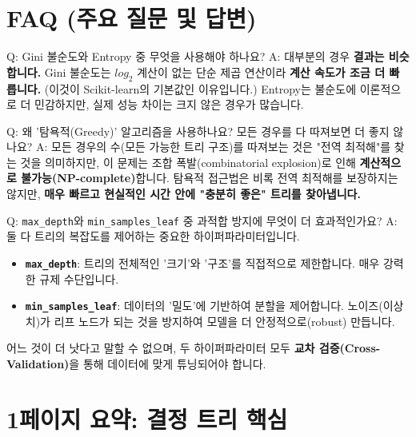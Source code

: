 \documentclass[11pt,a4paper]{book}
\theoremstyle{definition}
\begin{document}
\section{FAQ (주요 질문 및 답변)}

\begin{tcolorbox}{Q: Gini 불순도와 Entropy 중 무엇을 사용해야 하나요?}
    A: 대부분의 경우 \textbf{결과는 비슷합니다.}
    Gini 불순도는 $log_2$ 계산이 없는 단순 제곱 연산이라 \textbf{계산 속도가 조금 더 빠릅니다.} (이것이 Scikit-learn의 기본값인 이유입니다.)
    Entropy는 불순도에 이론적으로 더 민감하지만, 실제 성능 차이는 크지 않은 경우가 많습니다.
\end{tcolorbox}

\begin{tcolorbox}{Q: 왜 '탐욕적(Greedy)' 알고리즘을 사용하나요? 모든 경우를 다 따져보면 더 좋지 않나요?}
    A: 모든 경우의 수(모든 가능한 트리 구조)를 따져보는 것은 "전역 최적해"를 찾는 것을 의미하지만, 이 문제는 조합 폭발(combinatorial explosion)로 인해 \textbf{계산적으로 불가능(NP-complete)}합니다.
    탐욕적 접근법은 비록 전역 최적해를 보장하지는 않지만, \textbf{매우 빠르고 현실적인 시간 안에 "충분히 좋은" 트리를 찾아냅니다.}
\end{tcolorbox}

\begin{tcolorbox}{Q: \texttt{max\_depth}와 \texttt{min\_samples\_leaf} 중 과적합 방지에 무엇이 더 효과적인가요?}
    A: 둘 다 트리의 복잡도를 제어하는 중요한 하이퍼파라미터입니다.
    \begin{itemize}
        \item \textbf{\texttt{max\_depth}}: 트리의 전체적인 '크기'와 '구조'를 직접적으로 제한합니다. 매우 강력한 규제 수단입니다.
        \item \textbf{\texttt{min\_samples\_leaf}}: 데이터의 '밀도'에 기반하여 분할을 제어합니다. 노이즈(이상치)가 리프 노드가 되는 것을 방지하여 모델을 더 안정적으로(robust) 만듭니다.
    \end{itemize}
    어느 것이 더 낫다고 말할 수 없으며, 두 하이퍼파라미터 모두 \textbf{교차 검증(Cross-Validation)}을 통해 데이터에 맞게 튜닝되어야 합니다.
\end{tcolorbox}

\section{1페이지 요약: 결정 트리 핵심}
\end{document}
